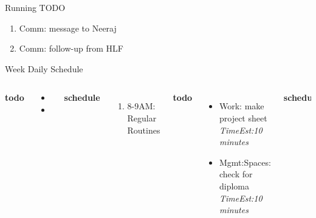 \documentclass[serif, mathserif, final]{beamer}
\newcommand{\te}[1]{\textit{TimeEst:}\textit{#1}}
\begin{document}
\begin{frame}
\begin{columns}
\begin{column}{0.50\linewidth}
\begin{block}{Running TODO}
\begin{enumerate}
    \item \small Comm: message to Neeraj
    \item \small Comm: follow-up from HLF
      
        \end{enumerate}
      \end{block} 

      \begin{block}{Week Daily Schedule} 
        \begin{columns} 
          \textbf{\small todo} \\ 
          \begin{itemize}
            \tiny \item \tiny 
          \item \tiny 
          \end{itemize} 
          \textbf{\small schedule} \\
          \begin{enumerate} 
            \tiny \item \tiny 8-9AM: Regular Routines 
          \end{enumerate} 
          
          \textbf{\small todo} \\
          \begin{itemize}
            \tiny \item \tiny Work: make project sheet \te{10 minutes} 
          \item \tiny Mgmt:Spaces: check for diploma \te{10 minutes} 
          \end{itemize}  
          \textbf{\small schedule} 
          \begin{enumerate}
            \tiny \item \tiny 10AM - 11AM = 
          \item \tiny 11AM - 12AM = make long-term goals 
          \item \tiny 12PM - 2PM = 
            \tiny \item \tiny 2PM -3PM = 
          \item \tiny 6PM - 10PM = 
          \end{enumerate}  
          

\end{columns}
\end{block}
\end{column}
\end{columns}
\end{frame}
\end{document}
